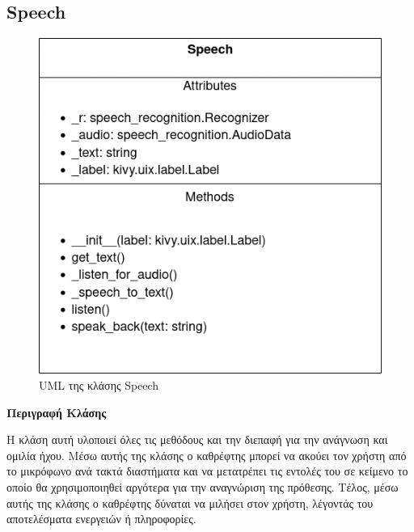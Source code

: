 \subsection{Speech}
\begin{figure}[h]
    \centering
    \includegraphics[scale=0.7]{images/chapter4/uml_diagrams/Speech.png}
    \caption{UML της κλάσης Speech}
    \label{fig:speech}
\end{figure}
\noindent\textbf{Περιγραφή Κλάσης}

Η κλάση αυτή υλοποιεί όλες τις μεθόδους και την διεπαφή για την ανάγνωση και ομιλία ήχου. Μέσω αυτής της κλάσης ο καθρέφτης μπορεί να ακούει τον χρήστη από το μικρόφωνο ανά τακτά διαστήματα και να μετατρέπει τις εντολές του σε κείμενο το οποίο θα χρησιμοποιηθεί αργότερα για την αναγνώριση της πρόθεσης. Τέλος, μέσω αυτής της κλάσης ο καθρέφτης δύναται να μιλήσει στον χρήστη, λέγοντάς του αποτελέσματα ενεργειών ή πληροφορίες.

